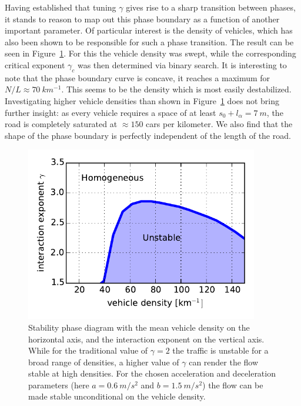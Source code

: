 Having established that tuning $\gamma$ gives rise to a sharp transition between phases, it stands to reason to map out this phase boundary as a function of another important parameter. Of particular interest is the density of vehicles, which has also been shown to be responsible for such a phase transition. The result can be seen in Figure~\ref{fig:phase_diagram}. For this the vehicle density was swept, while the corresponding critical exponent $\gamma_c$ was then determined via binary search. It is interesting to note that the phase boundary curve is concave, it reaches a maximum for $N/L \approx \SI{70}{km^{-1}}$. This seems to be the density which is most easily destabilized. Investigating higher vehicle densities than shown in Figure~\ref{fig:phase_diagram} does not bring further insight: as every vehicle requires a space of at least $s_0+l_\alpha= \SI{7}{m}$, the road is completely saturated at $\approx 150$ cars per kilometer. We also find that the shape of the phase boundary is perfectly independent of the length of the road.
\begin{figure}
    \centering
    \includegraphics[width=4in]{../img/phase_diagram.pdf}
    \caption{Stability phase diagram with the mean vehicle density on the horizontal axis, and the interaction exponent on the vertical axis. While for the traditional value of $\gamma=2$ the traffic is unstable for a broad range of densities, a higher value of $\gamma$ can render the flow stable at high densities. For the chosen acceleration and deceleration parameters (here $a=\SI{0.6}{m/s^2}$ and $b=\SI{1.5}{m/s^2}$) the flow can be made stable unconditional on the vehicle density.}
    \label{fig:phase_diagram}
\end{figure}


